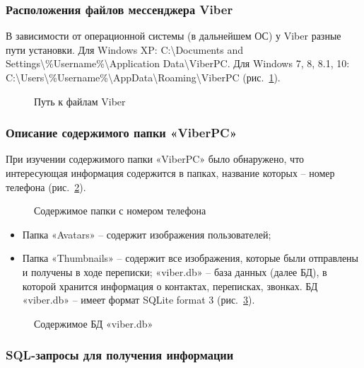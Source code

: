 \subsubsection{Расположения файлов мессенджера Viber}
 
В зависимости от операционной системы (в дальнейшем ОС) у Viber разные пути установки. Для Windows XP: C:\textbackslash Documents and Settings\textbackslash \%Username\%\textbackslash Application Data\textbackslash ViberPC.
Для Windows 7, 8, 8.1, 10: C:\textbackslash Users\textbackslash \%Username\%\textbackslash AppData\textbackslash Roaming\textbackslash ViberPC (рис.~\ref{kucher_1:kucher_1}).
 
\begin{figure}[h!]
\caption{ Путь к файлам Viber }
\label{kucher_1:kucher_1}
\end{figure}

\subsubsection{Описание содержимого папки «ViberPC»}

При изучении содержимого папки «ViberPC» было обнаружено, что интересующая информация содержится в папках, название которых – номер телефона (рис.~\ref{kucher_2:kucher_2}).
	

\begin{figure}[h!]
\caption{ Содержимое папки с номером телефона }
\label{kucher_2:kucher_2}
\end{figure} 

\begin{itemize}
  \item Папка «Avatars» – содержит изображения пользователей;
  \item Папка «Thumbnails» – содержит все изображения, которые были отправлены и получены в ходе переписки;
	«viber.db» – база данных (далее БД), в которой хранится информация о контактах, переписках, звонках.
	БД «viber.db» – имеет формат SQLite format 3 (рис.~\ref{kucher_3:kucher_3}).
\end{itemize}
 
\begin{figure}[h!]
\caption{ Содержимое БД «viber.db» }
\label{kucher_3:kucher_3}
\end{figure} 

\subsubsection{SQL-запросы для получения информации}

